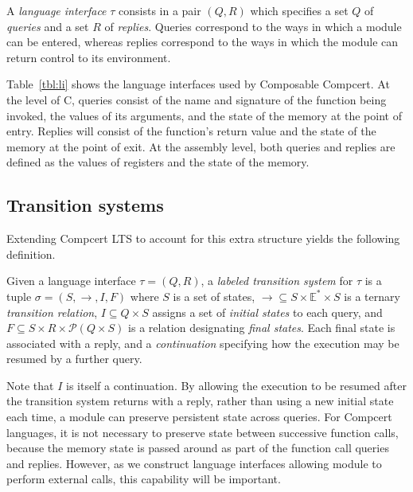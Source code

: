 \documentclass[acmsmall,10pt,review,anonymous]{acmart}
\begin{document}
\begin{definition}
A \emph{language interface} $\tau$ consists in a pair $(Q, R)$
which specifies
a set $Q$ of \emph{queries} and
a set $R$ of \emph{replies}.
Queries
correspond to the ways in which
a module can be entered, whereas
replies
correspond to the ways in which
the module can return control
to its environment.
\end{definition}

Table~\ref{tbl:li}
shows the language interfaces used by Composable Compcert.
At the level of C,
queries consist of
the name and signature of the function being invoked,
the values of its arguments,
and the state of the memory at the point of entry.
Replies
will consist of the function's return value
and the state of the memory at the point of exit.
At the assembly level,
both queries and replies are defined as
the values of registers and the state of the memory.


\subsection{Transition systems} %

Extending Compcert LTS to account for
this extra structure yields the following definition.

\begin{definition}
Given a language interface $\tau = (Q, R)$,
a \emph{labeled transition system} for $\tau$
is a tuple $\sigma = (S, \rightarrow, I, F)$ where
$S$ is a set of states,
${\rightarrow} \subseteq S \times \mathbb{E}^* \times S$
is a ternary \emph{transition relation},
$I \subseteq Q \times S$
assigns a set of \emph{initial states} to each query, and
$F \subseteq S \times R \times \mathcal{P}(Q \times S)$
is a relation designating \emph{final states}.
Each final state is associated with a reply,
and a \emph{continuation} specifying
how the execution may be resumed by a further query.
\end{definition}

Note that $I$ is itself a continuation.
By allowing the execution to be resumed
after the transition system returns with a reply,
rather than using a new initial state each time,
a module can preserve persistent state across queries.
For Compcert languages,
it is not necessary to preserve state between successive function calls,
because the memory state is passed around
as part of the function call queries and replies.
However,
as we construct language interfaces
allowing module to perform external calls,
this capability will be important.
\end{document}
